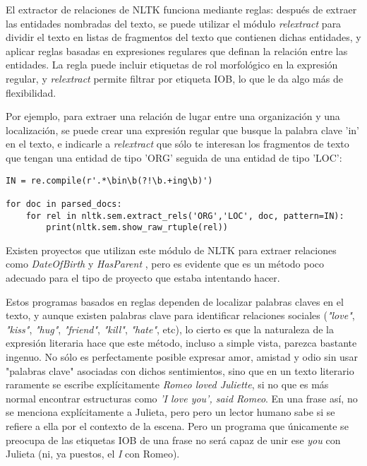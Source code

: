 \documentclass{pre-tfg}
\begin{document}
El extractor de relaciones de NLTK funciona mediante reglas: después de extraer las entidades nombradas del texto, se puede utilizar el módulo \textit{relextract} para dividir el texto en listas de fragmentos del texto que contienen dichas entidades, y aplicar reglas basadas en expresiones regulares que definan la relación entre las entidades. La regla puede incluir etiquetas de rol morfológico en la expresión regular, y \textit{relextract} permite filtrar por etiqueta IOB, lo que le da algo más de flexibilidad.

Por ejemplo, para extraer una relación de lugar entre una organización y una localización, se puede crear una expresión regular que busque la palabra clave 'in' en el texto, e indicarle a \textit{relextract} que sólo te interesan los fragmentos de texto que tengan una entidad de tipo 'ORG' seguida de una entidad de tipo 'LOC':
\begin{lstlisting}[style=consola, caption=Ejemplo de código que utiliza el módulo \textit{regexp} de NLTK para extraer relaciones de lugar y mostrarlas por pantalla. Adaptado del capítulo 7 de Natural Language Processing with Python \cite{bird_2012}]
IN = re.compile(r'.*\bin\b(?!\b.+ing\b)')

for doc in parsed_docs:
	for rel in nltk.sem.extract_rels('ORG','LOC', doc, pattern=IN):
		print(nltk.sem.show_raw_rtuple(rel))

\end{lstlisting}

Existen proyectos que utilizan este módulo de NLTK para extraer relaciones como \textit{DateOfBirth} y \textit{HasParent}  \cite{jose_2017}, pero es evidente que es un método poco adecuado para el tipo de proyecto que estaba intentando hacer.

Estos programas basados en reglas dependen de localizar palabras claves en el texto, y aunque existen palabras clave para identificar relaciones sociales (\textit{"love"}, \textit{"kiss"}, \textit{"hug"}, \textit{"friend"}, \textit{"kill"}, \textit{"hate"}, etc), lo cierto es que la naturaleza de la expresión literaria hace que este método, incluso a simple vista, parezca bastante ingenuo. No sólo es perfectamente posible expresar amor, amistad y odio sin usar "palabras clave" asociadas con dichos sentimientos, sino que en un texto literario raramente se escribe explícitamente \textit{Romeo loved Juliette}, si no que es más normal encontrar estructuras como \textit{'I love you', said Romeo}. En una frase así, no se menciona explícitamente a Julieta, pero pero un lector humano sabe si se refiere a ella por el contexto de la escena. Pero un programa que únicamente se preocupa de las etiquetas IOB de una frase no será capaz de unir ese \textit{you} con Julieta (ni, ya puestos, el \textit{I} con Romeo).
\end{document}
